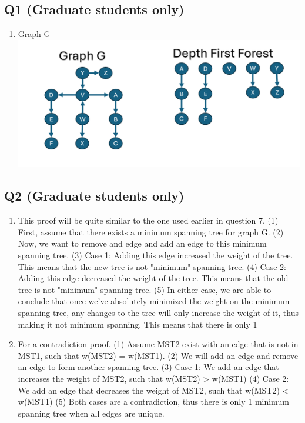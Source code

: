 \documentclass{article}
\begin{document}
\subsection*{Q1 (Graduate students only)}
\begin{enumerate}[label=(\alph*)]
    \item Graph G
    \subitem \includegraphics[width=.75\textwidth]{Grad1.png}
\end{enumerate}

\subsection*{Q2 (Graduate students only)}
\begin{enumerate}[label=(\alph*)]
    \item This proof will be quite similar to the one used earlier in question 7.
    \subitem (1) First, assume that there exists a minimum spanning tree for graph G.
    \subitem (2) Now, we want to remove and edge and add an edge to this minimum spanning tree.
    \subitem (3) Case 1: Adding this edge increased the weight of the tree. This means that the new tree is not "minimum" spanning tree.
    \subitem (4) Case 2: Adding this edge decreased the weight of the tree. This means that the old tree is not "minimum" spanning tree.
    \subitem (5) In either case, we are able to conclude that once we've absolutely minimized the weight on the minimum spanning tree, any changes to the tree will only increase the weight of it, thus making it not minimum spanning. This means that there is only 1

    \item For a contradiction proof. 
    \subitem (1) Assume MST2 exist with an edge that is not in MST1, such that w(MST2) = w(MST1).
    \subitem (2) We will add an edge and remove an edge to form another spanning tree.
    \subitem (3) Case 1: We add an edge that increases the weight of MST2, such that w(MST2) > w(MST1)
    \subitem (4) Case 2: We add an edge that decreases the weight of MST2, such that w(MST2) < w(MST1)
    \subitem (5) Both cases are a contradiction, thus there is only 1 minimum spanning tree when all edges are unique.
\end{enumerate}
\end{document}
